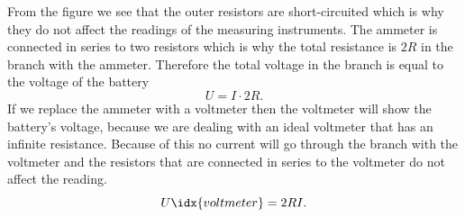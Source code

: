 {\ifEngSolution
From the figure we see that the outer resistors are short-circuited which is why they do not affect the readings of the measuring instruments. The ammeter is connected in series to two resistors which is why the total resistance is $2R$ in the branch with the ammeter. Therefore the total voltage in the branch is equal to the voltage of the battery
\[ U = I\cdot 2R.\] 
If we replace the ammeter with a voltmeter then the voltmeter will show the battery’s voltage, because we are dealing with an ideal voltmeter that has an infinite resistance. Because of this no current will go through the branch with the voltmeter and the resistors that are connected in series to the voltmeter do not affect the reading.
\[ U\idx{voltmeter} = 2RI.\]
\fi
}